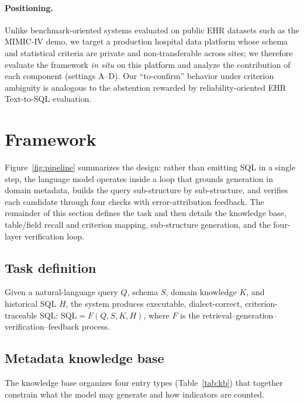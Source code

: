 \documentclass[11pt]{article}
\begin{document}
\paragraph{Positioning.} Unlike benchmark-oriented systems evaluated on public EHR datasets such as
the MIMIC-IV demo, we target a production hospital data platform whose schema and statistical
criteria are private and non-transferable across sites; we therefore evaluate the
framework \emph{in situ} on this platform and analyze the contribution of each component
(settings A--D). Our ``to-confirm'' behavior under criterion ambiguity is analogous to the
abstention rewarded by reliability-oriented EHR Text-to-SQL evaluation. %

\section{Framework}
Figure~\ref{fig:pipeline} summarizes the design: rather than emitting SQL in a single step, the
language model operates inside a loop that grounds generation in domain metadata, builds the query
sub-structure by sub-structure, and verifies each candidate through four checks with
error-attribution feedback. The remainder of this section defines the task and then details the
knowledge base, table/field recall and criterion mapping, sub-structure generation, and the
four-layer verification loop.

\subsection{Task definition}
Given a natural-language query $Q$, schema $S$, domain knowledge $K$, and historical SQL $H$, the
system produces executable, dialect-correct, criterion-traceable SQL: $\text{SQL}=F(Q,S,K,H)$,
where $F$ is the retrieval--generation--verification--feedback process.

\subsection{Metadata knowledge base}
The knowledge base organizes four entry types (Table~\ref{tab:kb}) that together constrain what the
model may generate and how indicators are counted.
\end{document}
